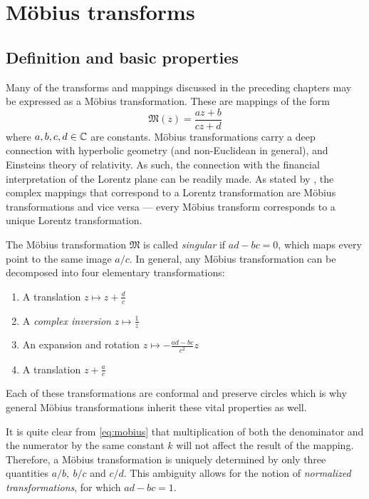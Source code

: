 \chapter{Möbius transforms}
\label{chap:moebius_transforms}

\section{Definition and basic properties}
Many of the transforms and mappings discussed in the preceding chapters may be expressed as a Möbius transformation. These are mappings of the form \cite{Needham1997}
\begin{equation}
    \mathfrak{M}(z) = \frac{az + b}{cz + d}
    \label{eq:mobius}
\end{equation}
where \(a, b, c, d \in \mathbb{C} \) are constants. Möbius transformations carry a deep connection with hyperbolic geometry (and non-Euclidean in general), and Einsteins theory of relativity. As such, the connection with the financial interpretation of the Lorentz plane can be readily made. As stated by \citet{Needham1997}, the complex mappings that correspond to a Lorentz transformation are Möbius transformations and vice versa --- every Möbius transform corresponds to a unique Lorentz transformation.

The Möbius transformation \(\mathfrak{M}\) is called \emph{singular} if \(ad - bc = 0\), which maps every point to the same image \(a/c\). In general, any Möbius transformation can be decomposed into four elementary transformations:
\begin{enumerate}
    \item A translation \(z \mapsto z + \frac{d}{c}\)
    \item A \emph{complex inversion} \(z \mapsto \frac{1}{z}\)
    \item An expansion and rotation \(z \mapsto -\frac{ad - bc}{c^2}z\)
    \item A translation \(z + \frac{a}{c}\)
\end{enumerate}
Each of these transformations are conformal and preserve circles which is why general Möbius transformations inherit these vital properties as well. 

It is quite clear from \cref{eq:mobius} that multiplication of both the denominator and the numerator by the same constant \(k\) will not affect the result of the mapping. Therefore, a Möbius transformation is uniquely determined by only three quantities \(a/b,\ b/c\) and \(c/d\). This ambiguity allows for the notion of \emph{normalized transformations}, for which \(ad - bc = 1\). 

